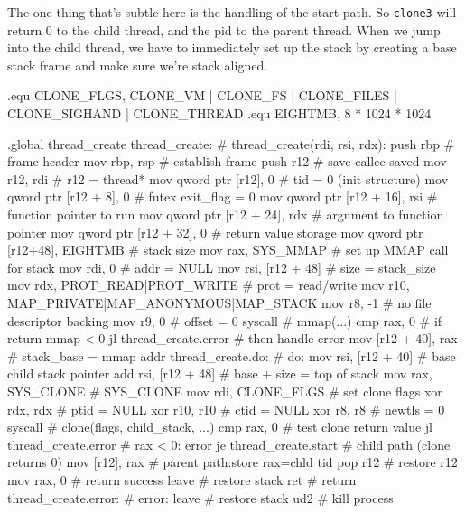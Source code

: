 The one thing that's subtle here is the handling of the start path. So
\lstinline|clone3| will return 0 to the child thread, and the pid to the parent
thread. When we jump into the child thread, we have to immediately set up the
stack by creating a base stack frame and make sure we're stack aligned.

\begin{asm}
.equ    CLONE_FLGS, CLONE_VM | CLONE_FS | CLONE_FILES | CLONE_SIGHAND | CLONE_THREAD
.equ    EIGHTMB,    8 * 1024 * 1024

.global thread_create
thread_create:                              # thread_create(rdi, rsi, rdx):
	push	rbp			    #   frame header
	mov	rbp, rsp		    #   establish frame
	push	r12                         #   save callee-saved
	mov	r12, rdi                    #   r12 = thread*
	mov	qword ptr [r12], 0          #   tid = 0 (init structure)
	mov	qword ptr [r12 + 8], 0      #   futex exit_flag = 0
	mov	qword ptr [r12 + 16], rsi   #   function pointer to run
	mov	qword ptr [r12 + 24], rdx   #   argument to function pointer
	mov	qword ptr [r12 + 32], 0     #   return value storage
	mov	qword ptr [r12+48], EIGHTMB #   stack size
	mov	rax, SYS_MMAP		    # 	 set up MMAP call for stack
	mov	rdi, 0                      #   addr = NULL
	mov	rsi, [r12 + 48]             #   size = stack_size
	mov	rdx, PROT_READ|PROT_WRITE   #   prot = read/write
	mov	r10, MAP_PRIVATE|MAP_ANONYMOUS|MAP_STACK
	mov	r8, -1                      #   no file descriptor backing
	mov	r9, 0                       #   offset = 0
	syscall				    #   mmap(...)
	cmp	rax, 0			    #   if return mmap < 0
	jl	thread_create.error	    #   then handle error
	mov	[r12 + 40], rax             #   stack_base = mmap addr
thread_create.do:			    # do:
	mov	rsi, [r12 + 40]		    #   base child stack pointer
	add	rsi, [r12 + 48]             #   base + size = top of stack
	mov	rax, SYS_CLONE		    #   SYS_CLONE
	mov	rdi, CLONE_FLGS             #   set clone flags
	xor	rdx, rdx                    #   ptid = NULL
	xor	r10, r10                    #   ctid = NULL
	xor	r8, r8                      #   newtls = 0
	syscall				    #   clone(flags, child_stack, ...)
	cmp	rax, 0			    #   test clone return value
	jl	thread_create.error	    #   rax < 0: error
	je	thread_create.start         #   child path (clone returns 0)
	mov	[r12], rax		    #   parent path:store rax=chld tid
	pop	r12			    #   restore r12
	mov	rax, 0			    #   return success
	leave				    #   restore stack
	ret				    #   return
thread_create.error:			    # error:
	leave				    #   restore stack
	ud2				    #   kill process

\end{asm}
